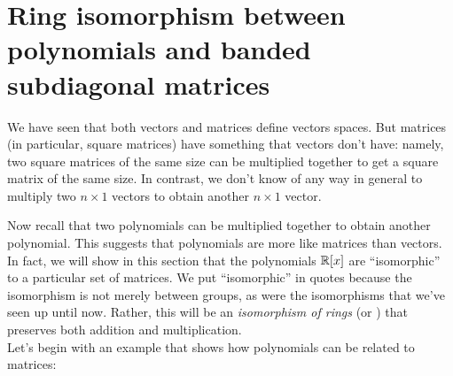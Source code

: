 \section{Ring isomorphism between polynomials and banded subdiagonal matrices}\label{sec:ringIsoPolyMat}

We have seen that both vectors and matrices define vectors spaces.  But matrices (in particular, square matrices) have something that vectors don't have: namely, two square matrices of the same size can be multiplied together to get a square matrix of the same size.  In contrast, we don't know of any way in general to multiply two $n \times 1$ vectors to obtain another $n \times 1$ vector. 

Now recall that two polynomials can be multiplied together to obtain another polynomial. This suggests that polynomials are more like matrices than vectors. In fact, we will show in this section that the polynomials $\mathbb{R}[x]$ are ``isomorphic'' to a particular set of matrices.  We put ``isomorphic'' in quotes because the isomorphism is not merely between groups, as were the isomorphisms that we've seen up until now. Rather, this will be an \emph{isomorphism of rings} (or ) that preserves both addition and multiplication.\\
Let's begin with an example that shows how polynomials can be related to matrices:

